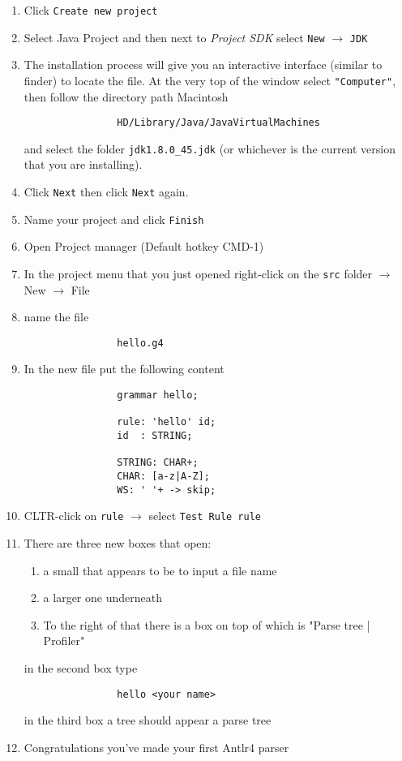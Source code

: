 \documentclass[../setup.tex]{subfiles}
\begin{document}
		\begin{enumerate}
			\item Click \texttt{Create new project}
			\item Select Java Project and then next to \textit{Project SDK} select \texttt{New} $\rightarrow$ \texttt{JDK}
			\item The installation process will give you an interactive interface (similar to finder) to locate the
			file. At the very top of the window select \texttt{"Computer"}, then follow the directory path Macintosh
			\begin{lstlisting}
				HD/Library/Java/JavaVirtualMachines
			\end{lstlisting}
			and select the folder \texttt{jdk1.8.0\_45.jdk} (or whichever is the current version that you are
			installing).
			\item Click \texttt{Next} then click \texttt{Next} again.
			\item Name your project and click \texttt{Finish}
			\item Open Project manager (Default hotkey CMD-1)
			\item In the project menu that you just opened right-click on the \texttt{src} folder $\rightarrow$ New $\rightarrow$ File
			\item name the file
			\begin{lstlisting}
				hello.g4
			\end{lstlisting}
			\item In the new file put the following content
			\begin{lstlisting}
				grammar hello;

				rule: 'hello' id;
				id  : STRING;

				STRING: CHAR+;
				CHAR: [a-z|A-Z];
				WS: ' '+ -> skip;
			\end{lstlisting}
			\item CLTR-click on \texttt{rule} $\rightarrow$ select \texttt{Test Rule rule}
			\item There are three new boxes that open:
			\begin{enumerate}
				\item a small that appears to be to input a file name
				\item a larger one underneath
				\item To the right of that there is a box on top of which is "Parse tree | Profiler"
			\end{enumerate}
			in the second box type
			\begin{lstlisting}
				hello <your name>
			\end{lstlisting}
			in the third box a tree should appear a parse tree
			\item Congratulations you've made your first Antlr4 parser

		\end{enumerate}
\end{document}

